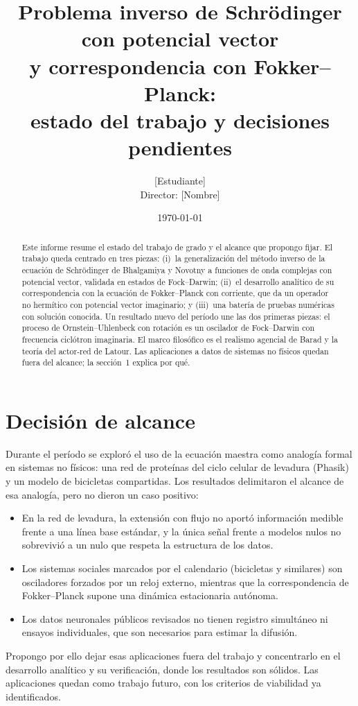 \documentclass[11pt,a4paper]{article}
\title{\textbf{Problema inverso de Schr\"odinger con potencial vector\\
y correspondencia con Fokker--Planck:\\ estado del trabajo y decisiones pendientes}}
\author{[Estudiante] \\ \small Director: [Nombre]}
\date{\today}
\begin{document}
\maketitle

\begin{abstract}
\noindent
Este informe resume el estado del trabajo de grado y el alcance que propongo fijar. El trabajo queda
centrado en tres piezas: (i)~la generalizaci\'on del m\'etodo inverso de la ecuaci\'on de Schr\"odinger de
Bhalgamiya y Novotny a funciones de onda complejas con potencial vector, validada en estados de Fock--Darwin;
(ii)~el desarrollo anal\'itico de su correspondencia con la ecuaci\'on de Fokker--Planck con corriente, que da un
operador no herm\'itico con potencial vector imaginario; y (iii)~una bater\'ia de pruebas num\'ericas con
soluci\'on conocida. Un resultado nuevo del per\'iodo une las dos primeras piezas: el proceso de
Ornstein--Uhlenbeck con rotaci\'on es un oscilador de Fock--Darwin con frecuencia cicl\'otron imaginaria. El
marco filos\'ofico es el realismo agencial de Barad y la teor\'ia del actor-red de Latour. Las aplicaciones a
datos de sistemas no f\'isicos quedan fuera del alcance; la secci\'on~1 explica por qu\'e.
\end{abstract}

\section{Decisi\'on de alcance}
Durante el per\'iodo se explor\'o el uso de la ecuaci\'on maestra como analog\'ia formal en sistemas no
f\'isicos: una red de prote\'inas del ciclo celular de levadura (Phasik) y un modelo de bicicletas compartidas.
Los resultados delimitaron el alcance de esa analog\'ia, pero no dieron un caso positivo:
\begin{itemize}[leftmargin=1.6em]
  \item En la red de levadura, la extensi\'on con flujo no aport\'o informaci\'on medible frente a una l\'inea
        base est\'andar, y la \'unica se\~nal frente a modelos nulos no sobrevivi\'o a un nulo que respeta la
        estructura de los datos.
  \item Los sistemas sociales marcados por el calendario (bicicletas y similares) son osciladores forzados por
        un reloj externo, mientras que la correspondencia de Fokker--Planck supone una din\'amica estacionaria
        aut\'onoma.
  \item Los datos neuronales p\'ublicos revisados no tienen registro simult\'aneo ni ensayos individuales, que
        son necesarios para estimar la difusi\'on.
\end{itemize}
Propongo por ello dejar esas aplicaciones fuera del trabajo y concentrarlo en el desarrollo anal\'itico y su
verificaci\'on, donde los resultados son s\'olidos. Las aplicaciones quedan como trabajo futuro, con los
criterios de viabilidad ya identificados.
\end{document}
